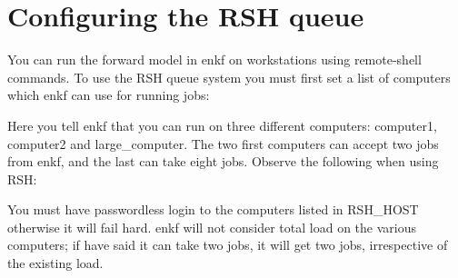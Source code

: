 \documentclass[letterpaper,10pt,english]{sphinxmanual}
\begin{document}
\section{Configuring the RSH queue}
\label{\detokenize{keywords/index:configuring-the-rsh-queue}}\label{\detokenize{keywords/index:id15}}\label{\detokenize{keywords/index:rsh-host}}
\begin{sphinxShadowBox}

You can run the forward model in enkf on workstations using remote-shell
commands. To use the RSH queue system you must first set a list of computers
which enkf can use for running jobs:

%
\begin{sphinxVerbatim}[commandchars=\\\{\}]
        
\end{sphinxVerbatim}

Here you tell enkf that you can run on three different computers: computer1,
computer2 and large\_computer. The two first computers can accept two jobs from
enkf, and the last can take eight jobs. Observe the following when using RSH:

You must have passwordless login to the computers listed in RSH\_HOST otherwise
it will fail hard. enkf will not consider total load on the various computers;
if have said it can take two jobs, it will get two jobs, irrespective of the
existing load.
\end{sphinxShadowBox}
\label{\detokenize{keywords/index:rsh-command}}
\end{document}
